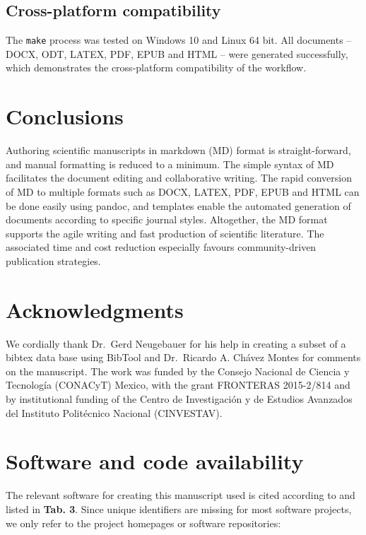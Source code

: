 \documentclass[10pt,fleqn]{wlpeerj}
\begin{document}
\subsection{Cross-platform
compatibility}\label{cross-platform-compatibility}

The
\texttt{make}
process
was
tested
on
Windows
10
and
Linux
64
bit.
All
documents
--
DOCX,
ODT,
LATEX,
PDF,
EPUB
and
HTML
--
were
generated
successfully,
which
demonstrates
the
cross-platform
compatibility
of
the
workflow.

\section{Conclusions}\label{conclusions}

Authoring
scientific
manuscripts
in
markdown
(MD)
format
is
straight-forward,
and
manual
formatting
is
reduced
to a
minimum.
The
simple
syntax
of MD
facilitates
the
document
editing
and
collaborative
writing.
The
rapid
conversion
of MD
to
multiple
formats
such
as
DOCX,
LATEX,
PDF,
EPUB
and
HTML
can
be
done
easily
using
pandoc,
and
templates
enable
the
automated
generation
of
documents
according
to
specific
journal
styles.
Altogether,
the
MD
format
supports
the
agile
writing
and
fast
production
of
scientific
literature.
The
associated
time
and
cost
reduction
especially
favours
community-driven
publication
strategies.

\section{Acknowledgments}\label{acknowledgments}

We
cordially
thank
Dr.~Gerd
Neugebauer
for
his
help
in
creating
a
subset
of a
bibtex
data
base
using
BibTool
and
Dr.~Ricardo
A.
Chávez
Montes
for
comments
on
the
manuscript.
The
work
was
funded
by
the
Consejo
Nacional
de
Ciencia
y
Tecnología
(CONACyT)
Mexico,
with
the
grant
FRONTERAS
2015-2/814
and
by
institutional
funding
of
the
Centro
de
Investigación
y de
Estudios
Avanzados
del
Instituto
Politécnico
Nacional
(CINVESTAV).

\section{Software
and
code
availability}\label{software-and-code-availability}

The
relevant
software
for
creating
this
manuscript
used
is
cited
according
to
\citep{smith_software_2016}
and
listed
in
\textbf{Tab.
3}.
Since
unique
identifiers
are
missing
for
most
software
projects,
we
only
refer
to
the
project
homepages
or
software
repositories:
\end{document}
